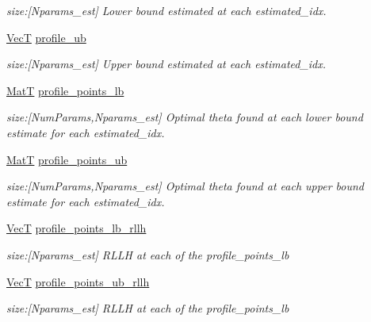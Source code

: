 \begin{DoxyCompactItemize}
\begin{DoxyCompactList}\small\item\em size\+:\mbox{[}Nparams\+\_\+est\mbox{]} Lower bound estimated at each estimated\+\_\+idx. \end{DoxyCompactList}\item 
\hyperlink{namespacemappel_a2225ad69f358daa3f4f99282a35b9a3a}{VecT} \hyperlink{structmappel_1_1estimator_1_1ProfileBoundsData_a8c7233892f731a927d21ec086eaca33f}{profile\+\_\+ub}
\begin{DoxyCompactList}\small\item\em size\+:\mbox{[}Nparams\+\_\+est\mbox{]} Upper bound estimated at each estimated\+\_\+idx. \end{DoxyCompactList}\item 
\hyperlink{namespacemappel_a7091ab87c528041f7e2027195fad8915}{MatT} \hyperlink{structmappel_1_1estimator_1_1ProfileBoundsData_ad6746d8a2946cba52c8c207fc0f57ef7}{profile\+\_\+points\+\_\+lb}
\begin{DoxyCompactList}\small\item\em size\+:\mbox{[}Num\+Params,Nparams\+\_\+est\mbox{]} Optimal theta found at each lower bound estimate for each estimated\+\_\+idx. \end{DoxyCompactList}\item 
\hyperlink{namespacemappel_a7091ab87c528041f7e2027195fad8915}{MatT} \hyperlink{structmappel_1_1estimator_1_1ProfileBoundsData_a51335985679f314252bac9a681e5ee4d}{profile\+\_\+points\+\_\+ub}
\begin{DoxyCompactList}\small\item\em size\+:\mbox{[}Num\+Params,Nparams\+\_\+est\mbox{]} Optimal theta found at each upper bound estimate for each estimated\+\_\+idx. \end{DoxyCompactList}\item 
\hyperlink{namespacemappel_a2225ad69f358daa3f4f99282a35b9a3a}{VecT} \hyperlink{structmappel_1_1estimator_1_1ProfileBoundsData_a1b60b8277319ad91eeb193d76c40e8e2}{profile\+\_\+points\+\_\+lb\+\_\+rllh}
\begin{DoxyCompactList}\small\item\em size\+:\mbox{[}Nparams\+\_\+est\mbox{]} R\+L\+LH at each of the profile\+\_\+points\+\_\+lb \end{DoxyCompactList}\item 
\hyperlink{namespacemappel_a2225ad69f358daa3f4f99282a35b9a3a}{VecT} \hyperlink{structmappel_1_1estimator_1_1ProfileBoundsData_abaf20418fe819719e7958936e429682e}{profile\+\_\+points\+\_\+ub\+\_\+rllh}
\begin{DoxyCompactList}\small\item\em size\+:\mbox{[}Nparams\+\_\+est\mbox{]} R\+L\+LH at each of the profile\+\_\+points\+\_\+lb \end{DoxyCompactList}\end{DoxyCompactItemize}


